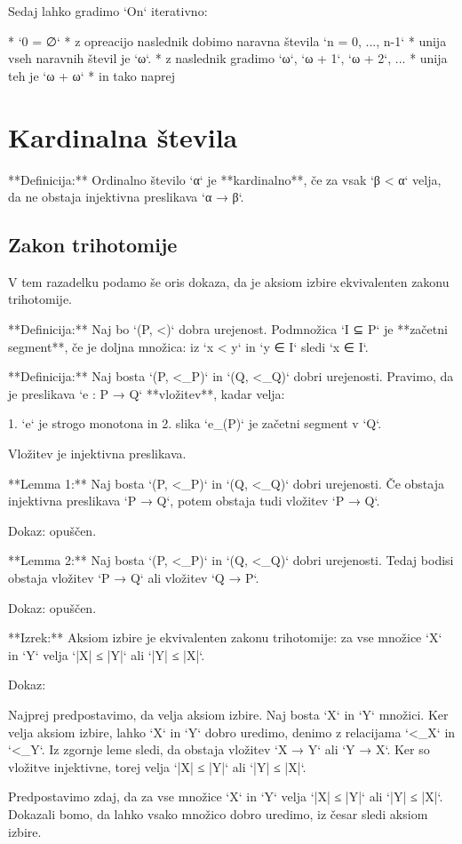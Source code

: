 Sedaj lahko gradimo `On` iterativno:

* `0 = ∅`
* z opreacijo naslednik dobimo naravna števila `n = {0, ..., n-1}`
* unija vseh naravnih števil je `ω`.
* z naslednik gradimo `ω`, `ω + 1`, `ω + 2`, ...
* unija teh je `ω + ω`
* in tako naprej

\section{Kardinalna števila}

**Definicija:** Ordinalno število `α` je **kardinalno**, če za vsak `β < α`
velja, da ne obstaja injektivna preslikava `α → β`.

\subsection{Zakon trihotomije}

V tem razadelku podamo še oris dokaza, da je aksiom izbire ekvivalenten zakonu trihotomije.

**Definicija:** Naj bo `(P, <)` dobra urejenost. Podmnožica `I ⊆ P` je **začetni
segment**, če je doljna množica: iz `x < y` in `y ∈ I` sledi `x ∈ I`.

**Definicija:** Naj bosta `(P, <_P)` in `(Q, <_Q)` dobri urejenosti. Pravimo, da
je preslikava `e : P → Q` **vložitev**, kadar velja:

1. `e` je strogo monotona in
2. slika `e_(P)` je začetni segment v `Q`.

Vložitev je injektivna preslikava.

**Lemma 1:** Naj bosta `(P, <_P)` in `(Q, <_Q)` dobri urejenosti. Če obstaja
injektivna preslikava `P → Q`, potem obstaja tudi vložitev `P → Q`.

Dokaz: opuščen.

**Lemma 2:** Naj bosta `(P, <_P)` in `(Q, <_Q)` dobri urejenosti. Tedaj bodisi
obstaja vložitev `P → Q` ali vložitev `Q → P`.

Dokaz: opuščen.

**Izrek:** Aksiom izbire je ekvivalenten zakonu trihotomije: za vse množice `X` in `Y` velja
`|X| ≤ |Y|` ali `|Y| ≤ |X|`.

Dokaz:

Najprej predpostavimo, da velja aksiom izbire. Naj bosta `X` in `Y` množici. Ker
velja aksiom izbire, lahko `X` in `Y` dobro uredimo, denimo z relacijama `<_X`
in `<_Y`. Iz zgornje leme sledi, da obstaja vložitev `X → Y` ali `Y → X`.
Ker so vložitve injektivne, torej velja `|X| ≤ |Y|` ali `|Y| ≤ |X|`.

Predpostavimo zdaj, da za vse množice `X` in `Y` velja `|X| ≤ |Y|` ali `|Y| ≤
|X|`. Dokazali bomo, da lahko vsako množico dobro uredimo, iz česar sledi aksiom izbire.
